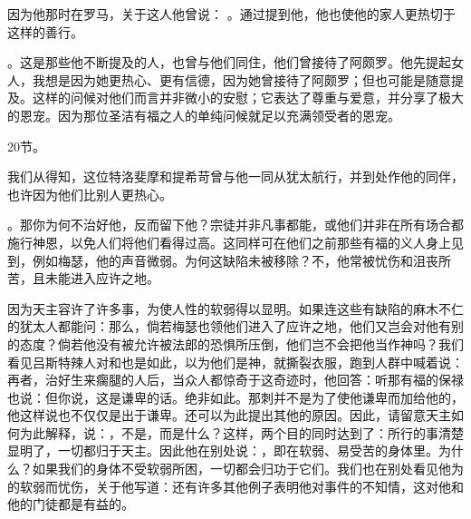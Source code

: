 因为他那时在罗马，关于这人他曾说： 。通过提到他，他也使他的家人更热切于这样的善行。\par

。这是那些他不断提及的人，也曾与他们同住，他们曾接待了阿颇罗。他先提起女人，我想是因为她更热心、更有信德，因为她曾接待了阿颇罗；但也可能是随意提及。这样的问候对他们而言并非微小的安慰；它表达了尊重与爱意，并分享了极大的恩宠。因为那位圣洁有福之人的单纯问候就足以充满领受者的恩宠。\par

20节。 \par

我们从得知，这位特洛斐摩和提希苛曾与他一同从犹太航行，并到处作他的同伴，也许因为他们比别人更热心。\par

。那你为何不治好他，反而留下他？宗徒并非凡事都能，或他们并非在所有场合都施行神恩，以免人们将他们看得过高。这同样可在他们之前那些有福的义人身上见到，例如梅瑟，他的声音微弱。为何这缺陷未被移除？不，他常被忧伤和沮丧所苦，且未能进入应许之地。\par

因为天主容许了许多事，为使人性的软弱得以显明。如果连这些有缺陷的麻木不仁的犹太人都能问：那么，倘若梅瑟也领他们进入了应许之地，他们又岂会对他有别的态度？倘若他没有被允许被法郎的恐惧所压倒，他们岂不会把他当作神吗？我们看见吕斯特辣人对和也是如此，以为他们是神，就撕裂衣服，跑到人群中喊着说：再者，治好生来瘸腿的人后，当众人都惊奇于这奇迹时，他回答：听那有福的保禄也说：但你说，这是谦卑的话。绝非如此。那刺并不是为了使他谦卑而加给他的，他这样说也不仅仅是出于谦卑。还可以为此提出其他的原因。因此，请留意天主如何为此解释，说：，不是，而是什么？这样，两个目的同时达到了：所行的事清楚显明了，一切都归于天主。因此他在别处说：，即在软弱、易受苦的身体里。为什么？如果我们的身体不受软弱所困，一切都会归功于它们。我们也在别处看见他为的软弱而忧伤，关于他写道：还有许多其他例子表明他对事件的不知情，这对他和他的门徒都是有益的。\par

